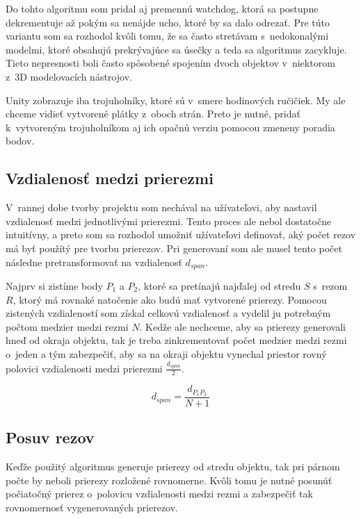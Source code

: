 Do tohto algoritmu som pridal aj premennú watchdog, ktorá sa postupne dekrementuje až pokým sa nenájde ucho, ktoré by sa dalo odrezať. Pre túto variantu som sa rozhodol kvôli tomu, že sa často stretávam s~nedokonalými modelmi, ktoré obsahujú prekrývajúce sa úsečky a teda sa algoritmus zacykluje. Tieto nepresnosti boli často spôsobené spojením dvoch objektov v~niektorom z~3D modelovacích nástrojov.

Unity zobrazuje iba trojuholníky, ktoré sú v~smere hodinových ručičiek. My ale chceme vidieť vytvorené plátky z~oboch strán. Preto je nutné, pridať k~vytvoreným trojuholníkom aj ich opačnú verziu pomocou zmeneny poradia bodov.

\subsection{Vzdialenosť medzi prierezmi}

V~rannej dobe tvorby projektu som nechával na užívateľovi, aby nastavil vzdialenosť medzi jednotlivými prierezmi. Tento proces ale nebol dostatočne intuitívny, a preto som sa rozhodol umožniť užívateľovi definovať, aký počet rezov má byť použítý pre tvorbu prierezov. Pri generovaní som ale musel tento počet následne pretransformovať na vzdialenosť $d_{span}$. 

Najprv si zistíme body $P_{1}$ a $P_{2}$, ktoré sa pretínajú najďalej od stredu $S$ s~rezom $R$, ktorý má rovnaké natočenie ako budú mať vytvorené prierezy. Pomocou zistených vzdialeností som získal celkovú vzdialenosť a vydelil ju potrebným počtom medzier medzi rezmi $N$. Kedže ale nechceme, aby sa prierezy generovali hneď od okraja objektu, tak je treba zinkrementovať počet medzier medzi rezmi o~jeden a tým zabezpečiť, aby sa na okraji objektu vynechal priestor rovný polovici vzdialenosti medzi prierezmi $\frac{d_{span}}{2}$.


\begin{equation}d_{span} = \frac{d_{P_{1}P_{2}}}{N + 1}
\label{eqn:span}
\end{equation}



\subsection{Posuv rezov}
Keďže použitý algoritmus generuje prierezy od stredu objektu, tak pri párnom počte by neboli prierezy rozložené rovnomerne. Kvôli tomu je nutné posunúť počiatočný prierez o~polovicu vzdialenosti medzi rezmi a zabezpečiť tak rovnomernosť vygenerovaných prierezov.

